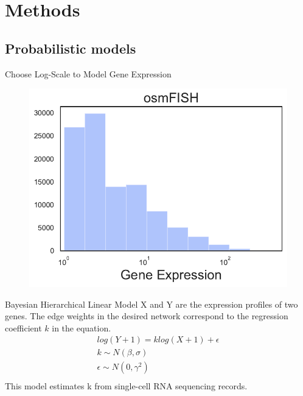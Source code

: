 \documentclass[handout,t]{beamer}
\begin{document}

\section{Methods}

\subsection{Probabilistic models}

\begin{frame}{Choose Log-Scale to Model Gene Expression}
\vspace{-0.5cm}
\begin{figure}
\includegraphics[width=0.7\columnwidth]{../figure/dist/osmFISH.pdf}
\end{figure}
\caption{The support of X and Y is a non-negative, we use $log(X+1)$ instead of $log(X)$ to map it onto the log-scale non-negative space.}

\end{frame}


\begin{frame}{Bayesian Hierarchical Linear Model}
X and Y are the expression profiles of two genes. The edge weights in the desired network correspond to the regression coefficient $k$ in the equation.
\begin{equation}
    \begin{array}{ll}
            log(Y+1) = k log(X+1) +\epsilon\\
            k \sim N(\beta, \sigma)\\
            \epsilon \sim N(0, \gamma^2)\\
    \end{array}
\end{equation}
This model estimates k from single-cell RNA sequencing records.
\end{frame}
\end{document}
